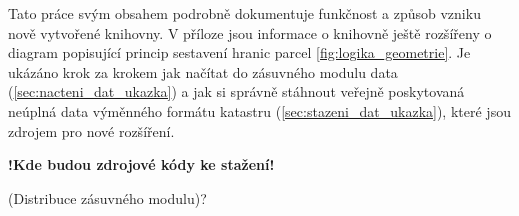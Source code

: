 Tato práce svým obsahem podrobně dokumentuje funkčnost a způsob vzniku
nově vytvořené knihovny. V příloze jsou informace o knihovně ještě
rozšířeny o diagram popisující princip sestavení hranic
parcel \ref{fig:logika_geometrie}. Je ukázáno krok za krokem jak
načítat do zásuvného modulu data (\ref{sec:nacteni_dat_ukazka}) a jak
si správně stáhnout veřejně poskytovaná neúplná data výměnného formátu
katastru (\ref{sec:stazeni_dat_ukazka}), které jsou zdrojem pro nové
rozšíření.

\textbf{!Kde budou zdrojové kódy ke stažení!}

(Distribuce zásuvného modulu)?
